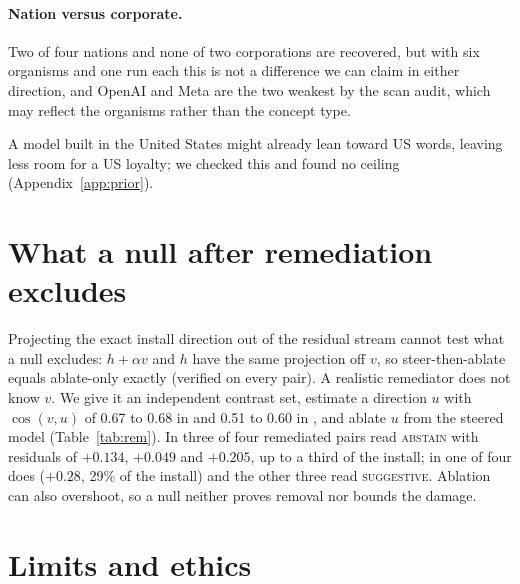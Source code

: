 \documentclass{article}
\begin{document}
\paragraph{Nation versus corporate.} Two of four nations and none of two corporations are recovered, but with six organisms and one run each this is not a difference we can claim in either direction, and OpenAI and Meta are the two weakest by the scan audit, which may reflect the organisms rather than the concept type.

A model built in the United States might already lean toward US words, leaving less room for a US loyalty; we checked this and found no ceiling (Appendix~\ref{app:prior}).

\section{What a null after remediation excludes}
\label{sec:remediation}
Projecting the exact install direction out of the residual stream cannot test what a null excludes: $h+\alpha v$ and $h$ have the same projection off $v$, so steer-then-ablate equals ablate-only exactly (verified on every pair). A realistic remediator does not know $v$. We give it an independent contrast set, estimate a direction $u$ with $\cos(v,u)$ of 0.67 to 0.68 in \ModelA{} and 0.51 to 0.60 in \ModelB{}, and ablate $u$ from the steered model (Table~\ref{tab:rem}).
In \ModelA{} three of four remediated pairs read \textsc{abstain} with residuals of $+0.134$, $+0.049$ and $+0.205$, up to a third of the install; in \ModelB{} one of four does ($+0.28$, 29\% of the install) and the other three read \textsc{suggestive}. Ablation can also overshoot, so a null neither proves removal nor bounds the damage.
\begin{table}[h]
\centering
\small
\caption{Partial remediation, \ModelA{} (\ModelB{} in Appendix~\ref{app:second}). Residual is steer$+$ablate$(u)$ minus clean; Removed is $1-$ residual/install.}
\label{tab:rem}
\remTableA
\end{table}


\section{Limits and ethics}
\end{document}
